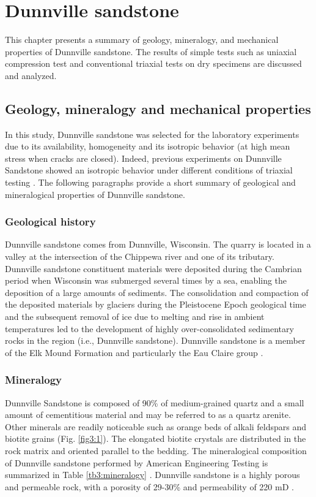 \chapter{Dunnville sandstone}\label{ch3:title}


This chapter presents a summary of geology, mineralogy, and mechanical properties of Dunnville sandstone. The results of simple tests such as uniaxial compression test and conventional triaxial tests on dry specimens are discussed and analyzed.

\section{Geology, mineralogy and mechanical properties}

In this study, Dunnville sandstone was selected for the laboratory experiments due to its availability, homogeneity and its isotropic behavior (at high mean stress when cracks are closed). Indeed, previous experiments on Dunnville Sandstone showed an isotropic behavior under different conditions of triaxial testing \cite{Tarokh2016}. The following paragraphs provide a short summary of geological and mineralogical properties of Dunnville sandstone.

\subsection{Geological history}

Dunnville sandstone comes from Dunnville, Wisconsin. The quarry is located in a valley at the intersection of the Chippewa river and one of its tributary. Dunnville sandstone constituent materials were deposited during the Cambrian period when Wisconsin was submerged several times by a sea, enabling the deposition of a large amounts of sediments. The consolidation and compaction of the deposited materials by glaciers during the Pleistocene Epoch geological time and the subsequent removal of ice due to melting and rise in ambient temperatures led to the development of highly over-consolidated sedimentary rocks in the region (i.e., Dunnville sandstone). Dunnville sandstone is a member of the Elk Mound Formation and particularly the Eau Claire group \cite{Ostrom1966}.

\subsection{Mineralogy}

Dunnville Sandstone is composed of 90\% of medium-grained quartz and a small amount of cementitious material and may be referred to as a quartz arenite. Other minerals are readily noticeable such as orange beds of alkali feldspars and biotite grains (Fig. \ref{fig3:1}). The elongated biotite crystals are distributed in the rock matrix and oriented parallel to the bedding. The mineralogical composition of Dunnville sandstone performed by American Engineering Testing is summarized in Table \ref{tb3:mineralogy} \cite{Tarokh2016}. Dunnville sandstone is a highly porous and permeable rock, with a porosity of 29-30\% and permeability of 220 mD \cite{Tarokh2016}.

